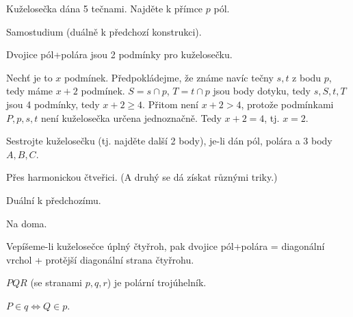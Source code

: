 \documentclass[12pt]{article}					%
\begin{document}
\begin{priklad}
	Kuželosečka dána 5 tečnami. Najděte k přímce $p$ pól.

	\begin{reseni}
		Samostudium (duálně k předchozí konstrukci).
	\end{reseni}
\end{priklad}

\begin{veta}
	Dvojice pól+polára jsou 2 podmínky pro kuželosečku.

	\begin{dukazin}
		Nechť je to $x$ podmínek. Předpokládejme, že známe navíc tečny $s, t$ z bodu $p$, tedy máme $x + 2$ podmínek. $S = s \cap p$, $T = t \cap p$ jsou body dotyku, tedy $s, S, t, T$ jsou 4 podmínky, tedy $x + 2 ≥ 4$. Přitom není $x + 2 > 4$, protože podmínkami $P, p, s, t$ není kuželosečka určena jednoznačně. Tedy $x + 2 = 4$, tj. $x = 2$.
	\end{dukazin}
\end{veta}

\begin{priklad}
	Sestrojte kuželosečku (tj. najděte další 2 body), je-li dán pól, polára a 3 body $A, B, C$.

	\begin{reseni}
		Přes harmonickou čtveřici. (A druhý se dá získat různými triky.)
	\end{reseni}
\end{priklad}

\begin{priklad}
	Duální k předchozímu.

	\begin{reseni}
		Na doma.
	\end{reseni}
\end{priklad}

\begin{poznamka}[Platí]
	Vepíšeme-li kuželosečce úplný čtyřroh, pak dvojice pól+polára = diagonální vrchol + protější diagonální strana čtyřrohu.
\end{poznamka}

\begin{definice}[Názvosloví]
	$PQR$ (se stranami $p, q, r$) je polární trojúhelník.
\end{definice}

\begin{poznamka}[Platí]
	$P \in q \Leftrightarrow Q \in p$.
\end{poznamka}
\end{document}
